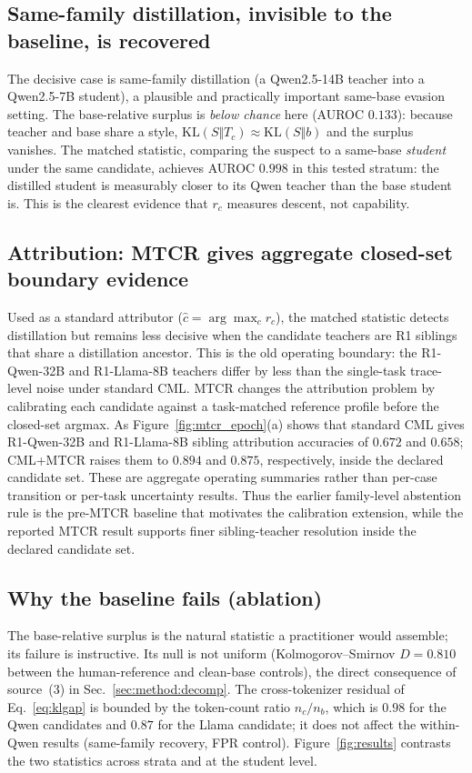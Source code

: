 \subsection{Same-family distillation, invisible to the baseline, is recovered}
The decisive case is same-family distillation (a Qwen2.5-14B teacher into a Qwen2.5-7B student), a plausible
and practically important same-base evasion setting. The base-relative surplus is \emph{below chance} here (AUROC $0.133$): because teacher
and base share a style, $\mathrm{KL}(S\Vert T_c)\!\approx\!\mathrm{KL}(S\Vert b)$ and the surplus vanishes.
The matched statistic, comparing the suspect to a same-base \emph{student} under the same candidate, achieves
AUROC $0.998$ in this tested stratum: the distilled student is measurably closer to its Qwen teacher than the
base student is. This is the clearest evidence that $r_c$ measures descent, not capability.

\subsection{Attribution: MTCR gives aggregate closed-set boundary evidence}
Used as a standard attributor ($\hat c=\arg\max_c r_c$), the matched statistic detects
distillation but remains less decisive when the candidate teachers are R1 siblings
that share a distillation ancestor. This is the old operating boundary: the R1-Qwen-32B
and R1-Llama-8B teachers differ by less than the single-task trace-level noise under
standard CML. MTCR changes the attribution problem by calibrating each candidate
against a task-matched reference profile before the closed-set argmax. As
Figure~\ref{fig:mtcr_epoch}(a) shows that standard CML gives R1-Qwen-32B and R1-Llama-8B sibling
attribution accuracies of $0.672$ and $0.658$; CML+MTCR raises them to $0.894$ and
$0.875$, respectively, inside the declared candidate set. These are aggregate
operating summaries rather than per-case transition or per-task uncertainty results. Thus the earlier
family-level abstention rule is the pre-MTCR baseline that motivates the calibration
extension, while the reported MTCR result supports finer sibling-teacher resolution inside the declared candidate set.

\subsection{Why the baseline fails (ablation)}
The base-relative surplus is the natural statistic a practitioner would assemble; its failure is instructive. Its
null is not uniform (Kolmogorov--Smirnov $D=0.810$ between the human-reference and clean-base controls), the direct
consequence of source~(3) in Sec.~\ref{sec:method:decomp}. The cross-tokenizer residual of Eq.~\eqref{eq:klgap}
is bounded by the token-count ratio $n_c/n_b$, which is $0.98$ for the Qwen candidates and $0.87$ for the
Llama candidate; it does not affect the within-Qwen results (same-family recovery, FPR control). Figure~\ref{fig:results}
contrasts the two statistics across strata and at the student level.

